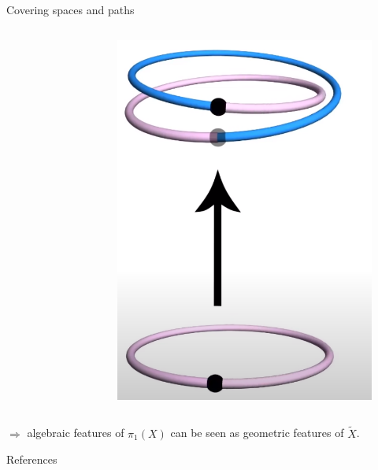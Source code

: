 \documentclass[9pt]{beamer}
\begin{document}
\begin{frame}{Covering spaces and paths}
\begin{columns}[T,onlytextwidth]
\begin{figure}
        \end{figure}
        \begin{figure}
            \centering
            \includegraphics[scale=0.1]{Pictures/lifting_path.png}
        \end{figure}
  
    \end{columns}

    $\Rightarrow$ algebraic features of $\pi_1(X)$ can be seen as geometric features of $\tilde{X}$.
    
\end{frame}


\begin{frame}[allowframebreaks]{References}

    
    

\end{frame}
\end{document}
